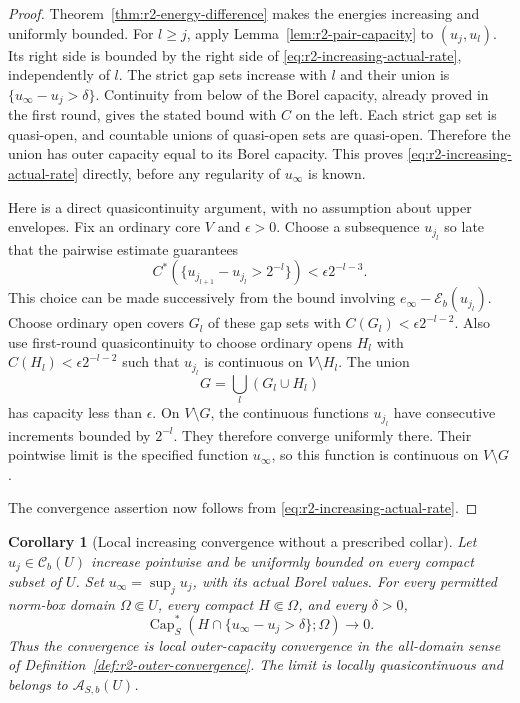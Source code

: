 \documentclass[11pt,a4paper]{article}
\numberwithin{equation}{section}
\newtheorem{corollary}[theorem]{Corollary}
\theoremstyle{definition}
\theoremstyle{remark}
\newcommand{\Cb}{\mathcal C_b}
\begin{document}
\begin{proof}
Theorem~\ref{thm:r2-energy-difference} makes the energies increasing
and uniformly bounded. For $l\geq j$, apply
Lemma~\ref{lem:r2-pair-capacity} to $(u_j,u_l)$. Its right side is
bounded by the right side of \eqref{eq:r2-increasing-actual-rate},
independently of $l$. The strict gap sets increase with $l$ and their
union is $\{u_\infty-u_j>\delta\}$. Continuity from below of the
Borel capacity, already proved in the first round, gives the stated
bound with $C$ on the left. Each strict gap set is quasi-open, and
countable unions of quasi-open sets are quasi-open. Therefore the
union has outer capacity equal to its Borel capacity. This proves
\eqref{eq:r2-increasing-actual-rate} directly, before any regularity
of $u_\infty$ is known.

Here is a direct quasicontinuity argument, with no assumption about
upper envelopes. Fix an ordinary core $V$ and $\epsilon>0$. Choose
a subsequence $u_{j_l}$ so late that the pairwise estimate guarantees
\[
 C^*(\{u_{j_{l+1}}-u_{j_l}>2^{-l}\})
       <\epsilon2^{-l-3}.
\]
This choice can be made successively from the bound involving
$e_\infty-\mathcal E_b(u_{j_l})$. Choose ordinary open covers $G_l$
of these gap sets with $C(G_l)<\epsilon2^{-l-2}$. Also use
first-round quasicontinuity to choose ordinary opens $H_l$ with
$C(H_l)<\epsilon2^{-l-2}$ such that $u_{j_l}$ is continuous on
$V\setminus H_l$. The union
\[
 G=\bigcup_l(G_l\cup H_l)
\]
has capacity less than $\epsilon$. On $V\setminus G$, the continuous
functions $u_{j_l}$ have consecutive increments bounded by $2^{-l}$.
They therefore converge uniformly there. Their pointwise limit is
the specified function $u_\infty$, so this function is continuous
on $V\setminus G$.

The convergence assertion now follows from
\eqref{eq:r2-increasing-actual-rate}.
\end{proof}

\begin{corollary}[Local increasing convergence without a prescribed collar]
\label{cor:r2-local-increasing}
Let $u_j\in\Cb(U)$ increase pointwise and be uniformly bounded on
every compact subset of $U$. Set $u_\infty=\sup_j u_j$, with its
actual Borel values. For every permitted norm-box domain
$\Omega\Subset U$, every compact $H\Subset\Omega$, and every
$\delta>0$,
\[
 \operatorname{Cap}_S^*(H\cap\{u_\infty-u_j>\delta\};\Omega)
       \longrightarrow0.
\]
Thus the convergence is local outer-capacity convergence in the
all-domain sense of Definition~\ref{def:r2-outer-convergence}.
The limit is locally quasicontinuous and belongs to
$\mathcal A_{S,b}(U)$.
\end{corollary}
\end{document}

